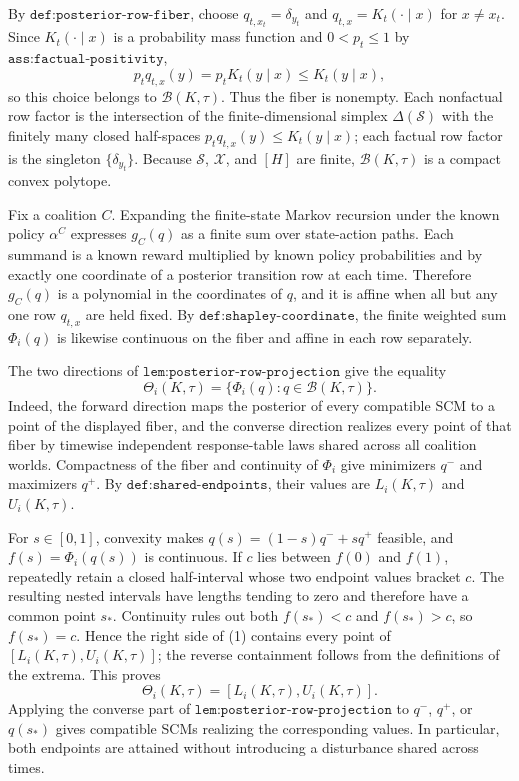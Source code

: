 By \(\texttt{def:posterior-row-fiber}\), choose \(q_{t,x_t}=\delta_{y_t}\) and \(q_{t,x}=K_t(\cdot\mid x)\) for \(x\ne x_t\).  Since \(K_t(\cdot\mid x)\) is a probability mass function and \(0<p_t\le 1\) by \(\texttt{ass:factual-positivity}\),
\[
 p_tq_{t,x}(y)=p_tK_t(y\mid x)\le K_t(y\mid x),
\]
so this choice belongs to \(\mathcal B(K,\tau)\).  Thus the fiber is nonempty.  Each nonfactual row factor is the intersection of the finite-dimensional simplex \(\Delta(\mathcal S)\) with the finitely many closed half-spaces \(p_tq_{t,x}(y)\le K_t(y\mid x)\); each factual row factor is the singleton \(\{\delta_{y_t}\}\).  Because \(\mathcal S\), \(\mathcal X\), and \([H]\) are finite, \(\mathcal B(K,\tau)\) is a compact convex polytope.

Fix a coalition \(C\).  Expanding the finite-state Markov recursion under the known policy \(\alpha^C\) expresses \(g_C(q)\) as a finite sum over state-action paths.  Each summand is a known reward multiplied by known policy probabilities and by exactly one coordinate of a posterior transition row at each time.  Therefore \(g_C(q)\) is a polynomial in the coordinates of \(q\), and it is affine when all but any one row \(q_{t,x}\) are held fixed.  By \(\texttt{def:shapley-coordinate}\), the finite weighted sum \(\Phi_i(q)\) is likewise continuous on the fiber and affine in each row separately.

The two directions of \(\texttt{lem:posterior-row-projection}\) give the equality
\[
 \Theta_i(K,\tau)
 =\{\Phi_i(q):q\in\mathcal B(K,\tau)\}.
 \tag{1}
\]
Indeed, the forward direction maps the posterior of every compatible SCM to a point of the displayed fiber, and the converse direction realizes every point of that fiber by timewise independent response-table laws shared across all coalition worlds.  Compactness of the fiber and continuity of \(\Phi_i\) give minimizers \(q^-\) and maximizers \(q^+\).  By \(\texttt{def:shared-endpoints}\), their values are \(L_i(K,\tau)\) and \(U_i(K,\tau)\).

For \(s\in[0,1]\), convexity makes \(q(s)=(1-s)q^-+sq^+\) feasible, and \(f(s)=\Phi_i(q(s))\) is continuous.  If \(c\) lies between \(f(0)\) and \(f(1)\), repeatedly retain a closed half-interval whose two endpoint values bracket \(c\).  The resulting nested intervals have lengths tending to zero and therefore have a common point \(s_*\).  Continuity rules out both \(f(s_*)<c\) and \(f(s_*)>c\), so \(f(s_*)=c\).  Hence the right side of (1) contains every point of \([L_i(K,\tau),U_i(K,\tau)]\); the reverse containment follows from the definitions of the extrema.  This proves
\[
 \Theta_i(K,\tau)=[L_i(K,\tau),U_i(K,\tau)].
\]
Applying the converse part of \(\texttt{lem:posterior-row-projection}\) to \(q^-\), \(q^+\), or \(q(s_*)\) gives compatible SCMs realizing the corresponding values.  In particular, both endpoints are attained without introducing a disturbance shared across times.

